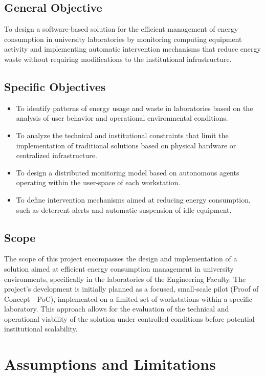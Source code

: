 \documentclass[12pt,a4paper]{article}
\begin{document}
\subsection{General Objective}
To design a software-based solution for the efficient management of energy consumption in university laboratories by monitoring computing equipment activity and implementing automatic intervention mechanisms that reduce energy waste without requiring modifications to the institutional infrastructure.

\subsection{Specific Objectives}
\begin{itemize}
    \item To identify patterns of energy usage and waste in laboratories based on the analysis of user behavior and operational environmental conditions.
    \item To analyze the technical and institutional constraints that limit the implementation of traditional solutions based on physical hardware or centralized infrastructure.
    \item To design a distributed monitoring model based on autonomous agents operating within the user-space of each workstation.
    \item To define intervention mechanisms aimed at reducing energy consumption, such as deterrent alerts and automatic suspension of idle equipment.
\end{itemize}

\subsection{Scope}
The scope of this project encompasses the design and implementation of a solution aimed at efficient energy consumption management in university environments, specifically in the laboratories of the Engineering Faculty. The project's development is initially planned as a focused, small-scale pilot (Proof of Concept - PoC), implemented on a limited set of workstations within a specific laboratory. This approach allows for the evaluation of the technical and operational viability of the solution under controlled conditions before potential institutional scalability.

\section{Assumptions and Limitations}
\end{document}
